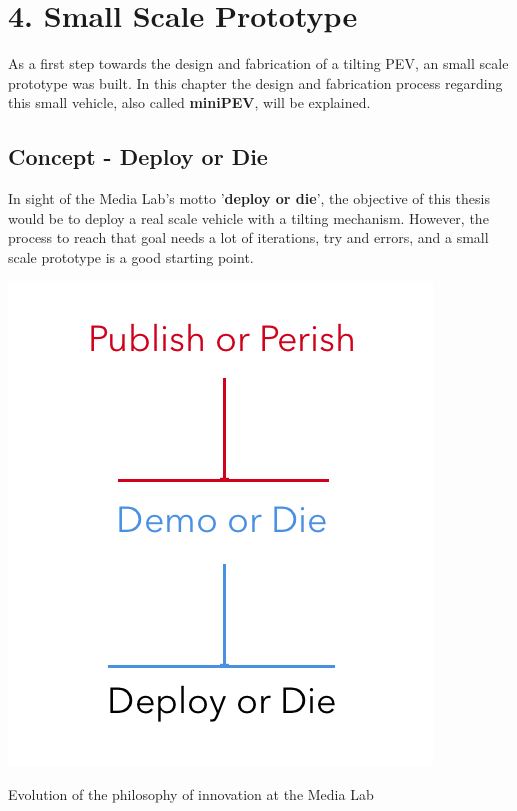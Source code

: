 \chapter{4. Small Scale Prototype}

As a first step towards the design and fabrication of a tilting PEV, an small scale prototype was built. In this chapter the design and fabrication process regarding this small vehicle, also called \textbf{miniPEV}, will be explained.

\section{Concept - Deploy or Die}

In sight of the Media Lab's motto '\textbf{deploy or die}'\cite{deploydie}, the objective of this thesis would be to deploy a real scale vehicle with a tilting mechanism. However, the process to reach that goal needs a lot of iterations, try and errors, and a small scale prototype is a good starting point.

\begin{marginfigure}
	\includegraphics[width=1.1\linewidth]{figs/04/deploy_die}
	\caption{Evolution of the philosophy of innovation at the Media Lab}
\end{marginfigure}


